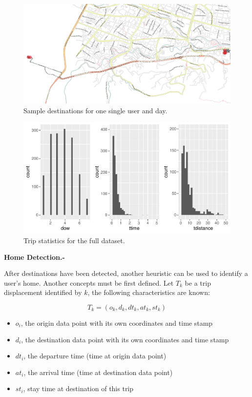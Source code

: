 \documentclass[runningheads]{llncs}
\begin{document}
\newpage

\begin{figure}

{\centering \includegraphics[width=0.9\linewidth]{paper/images/destinos} 

}

\caption{\label{fig6}Sample destinations for one single user and day.}\label{fig:unnamed-chunk-5}
\end{figure}
\begin{figure}

{\centering \includegraphics{conlatex_files/figure-latex/trips-plot-1} 

}

\caption{\label{fig7}Trip statistics for the full dataset.}\label{fig:trips-plot}
\end{figure}

\textbf{Home Detection.-}

After destinations have been detected, another heuristic can be used to identify a user's home. Another concepts must be first defined. Let \(T_k\) be a trip displacement identified by \(k\), the following characteristics are known:

\[T_k=(o_k, d_k, dt_k, at_k, st_k)\]

\begin{itemize}
\item
  \emph{\(o_i\)}, the origin data point with its own coordinates and time stamp
\item
  \emph{\(d_i\)}, the destination data point with its own coordinates and time stamp
\item
  \emph{\(dt_i\)}, the departure time (time at origin data point)
\item
  \emph{\(at_i\)}, the arrival time (time at destination data point)
\item
  \emph{\(st_i\)}, stay time at destination of this trip
\end{itemize}
\end{document}
